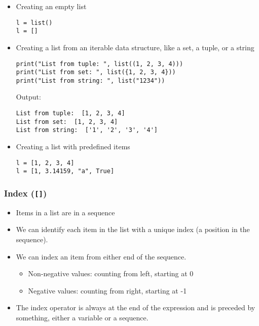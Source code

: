 \documentclass[11pt]{article}
\begin{document}
\begin{itemize}
\item Creating an empty list
\begin{verbatim}
l = list()
l = []
\end{verbatim}

\item Creating a list from an iterable data structure, like a set, a tuple, or a string

\begin{verbatim}
print("List from tuple: ", list((1, 2, 3, 4)))
print("List from set: ", list({1, 2, 3, 4}))
print("List from string: ", list("1234"))
\end{verbatim}

 \noindent Output:

\label{orgcfdbc00}
\begin{verbatim}
List from tuple:  [1, 2, 3, 4]
List from set:  [1, 2, 3, 4]
List from string:  ['1', '2', '3', '4']
\end{verbatim}

\item Creating a list with predefined items
\begin{verbatim}
l = [1, 2, 3, 4]
l = [1, 3.14159, "a", True]
\end{verbatim}
\end{itemize}

 \newpage
\subsubsection{Index (\texttt{[]})}
\label{sec:orgdb84e3f}
\begin{itemize}
\item Items in a list are in a sequence
\item We can identify each item in the list with a unique index (a position in the sequence).
\item We can index an item from either end of the sequence.
\begin{itemize}
\item Non-negative values: counting from left, starting at 0
\item Negative values: counting from right, starting at -1
\end{itemize}
\item The index operator is always at the end of the expression and is preceded by something, either a variable or a sequence.
\end{itemize}
\end{document}
